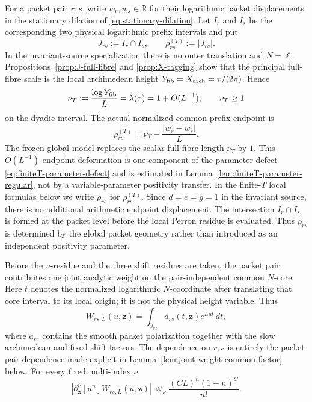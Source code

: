 For a packet pair $r,s$, write $w_r,w_s\in\mathbb R$ for their logarithmic
packet displacements in the stationary dilation of
\eqref{eq:stationary-dilation}. Let $I_r$ and $I_s$ be the corresponding two
physical logarithmic prefix intervals and put
\[
J_{rs}:=I_r\cap I_s,
\qquad
\rho_{rs}^{(T)}:=|J_{rs}|.
\]
In the invariant-source specialization there is no outer translation and
$N=\ell$. Propositions~\ref{prop:J-full-fibre} and \ref{prop:X-tagging} show
that the principal full-fibre scale is the local archimedean height
$Y_{\rm fib}=X_{\rm arch}=\tau/(2\pi)$. Hence
\[
\nu_T:=\frac{\log Y_{\rm fib}}{L}=\lambda(\tau)
=1+O(L^{-1}),
\qquad \nu_T\ge1
\]
on the dyadic interval.
The actual normalized common-prefix endpoint is
\begin{equation}
\boxed{
\rho_{rs}^{(T)}=\nu_T-\frac{|w_r-w_s|}{L}.
}
\label{eq:finiteT-common-endpoint}
\end{equation}
The frozen global model replaces the scalar full-fibre length $\nu_T$ by $1$.
This $O(L^{-1})$ endpoint deformation is one component of the parameter defect
\eqref{eq:finiteT-parameter-defect} and is estimated in
Lemma~\ref{lem:finiteT-parameter-regular}, not by a variable-parameter
positivity transfer.  In the finite-$T$ local formulas below we write
$\rho_{rs}$ for $\rho_{rs}^{(T)}$. Since $d=e=g=1$ in the invariant source,
there is no additional arithmetic endpoint displacement.
The intersection $I_r\cap I_s$ is formed at the packet level before the local
Perron residue is evaluated. Thus $\rho_{rs}$ is determined by the global
packet geometry rather than introduced as an independent positivity parameter.

Before the $u$-residue and the three shift residues are taken, the packet pair
contributes one joint analytic weight on the pair-independent common $N$-core.
Here $t$ denotes the normalized logarithmic $N$-coordinate after translating
that core interval to its local origin; it is not the physical height variable.
Thus
\begin{equation}
W_{rs,L}(u,\mathbf z)
=\int_{J_{rs}}a_{rs}(t,\mathbf z)e^{Lut}\,dt,
\label{eq:joint-weight}
\end{equation}
where $a_{rs}$ contains the smooth packet polarization together with the slow
archimedean and fixed shift factors.  The dependence on $r,s$ is entirely the
packet-pair dependence made explicit in
Lemma~\ref{lem:joint-weight-common-factor} below.
For every fixed multi-index $\nu$,
\begin{equation}
\left|\partial_{\mathbf z}^{\nu}[u^n]W_{rs,L}(u,\mathbf z)\right|
\ll_\nu \frac{(CL)^n(1+n)^C}{n!}.
\label{eq:joint-factorial}
\end{equation}

